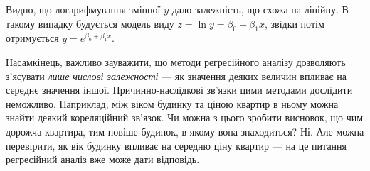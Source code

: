 Видно, що логарифмування змінної $y$ дало залежність, що схожа на лінійну. В такому випадку
будується модель виду $z = \ln y = \beta_0 + \beta_1 x$, звідки потім отримується $y = e^{\beta_0 + \beta_1 x}$.

Насамкінець, важливо зауважити, що методи регресійного аналізу
дозволяють з'ясувати \emph{лише числові залежності} --- як значення деяких величин 
впливає на середнє значення іншої. Причинно-наслідкові зв'язки цими методами дослідити неможливо.
Наприклад, між віком будинку та ціною квартир в ньому можна знайти деякий кореляційний зв'язок. 
Чи можна з цього зробити висновок, що чим дорожча квартира, тим новіше будинок, в якому вона знаходиться? Ні.
Але можна перевірити, як вік будинку впливає на середню ціну квартир --- на це питання регресійний аналіз вже може дати відповідь. 